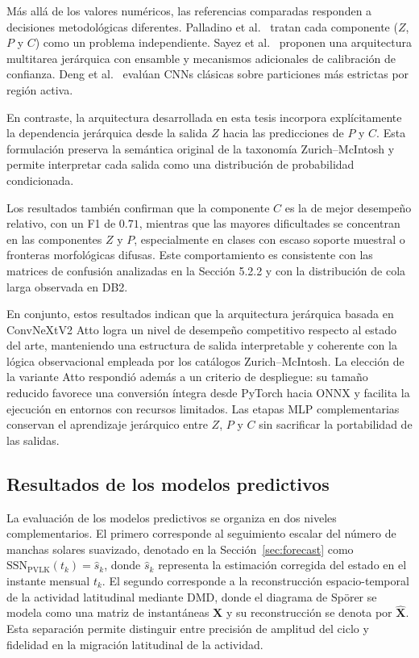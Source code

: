 Más allá de los valores numéricos, las referencias comparadas responden a
decisiones metodológicas diferentes. Palladino et al.~\citep{palladino2022sunspot}
tratan cada componente ($Z$, $P$ y $C$) como un problema independiente.
Sayez et al.~\citep{sayez2023sunscc} proponen una arquitectura multitarea
jerárquica con ensamble y mecanismos adicionales de calibración de confianza.
Deng et al.~\citep{deng2025mcintosh} evalúan CNNs clásicas sobre particiones
más estrictas por región activa.

En contraste, la arquitectura desarrollada en esta tesis incorpora explícitamente
la dependencia jerárquica desde la salida $Z$ hacia las predicciones de $P$ y
$C$. Esta formulación preserva la semántica original de la taxonomía
Zurich--McIntosh y permite interpretar cada salida como una distribución de
probabilidad condicionada.

Los resultados también confirman que la componente $C$ es la de mejor
desempeño relativo, con un F1 de $0.71$, mientras que las mayores dificultades
se concentran en las componentes $Z$ y $P$, especialmente en clases con escaso
soporte muestral o fronteras morfológicas difusas. Este comportamiento es
consistente con las matrices de confusión analizadas en la Sección 5.2.2 y con
la distribución de cola larga observada en DB2.

En conjunto, estos resultados indican que la arquitectura jerárquica basada en
ConvNeXtV2 Atto logra un nivel de desempeño competitivo respecto al estado del
arte, manteniendo una estructura de salida interpretable y coherente con la
lógica observacional empleada por los catálogos Zurich--McIntosh. La elección de
la variante Atto respondió además a un criterio de despliegue: su tamaño reducido
favorece una conversión íntegra desde PyTorch hacia ONNX y facilita la ejecución
en entornos con recursos limitados. Las etapas MLP complementarias conservan el
aprendizaje jerárquico entre $Z$, $P$ y $C$ sin sacrificar la portabilidad de
las salidas.


\subsection{Resultados de los modelos predictivos}

La evaluación de los modelos predictivos se organiza en dos niveles complementarios. El primero corresponde al seguimiento escalar del número de manchas solares suavizado, denotado en la Sección~\ref{sec:forecast} como $\mathrm{SSN}_{\mathrm{PVLK}}(t_k)=\widehat{s}_k$, donde $\widehat{s}_k$ representa la estimación corregida del estado en el instante mensual $t_k$. El segundo corresponde a la reconstrucción espacio-temporal de la actividad latitudinal mediante DMD, donde el diagrama de Spörer se modela como una matriz de instantáneas $\mathbf{X}$ y su reconstrucción se denota por $\widehat{\mathbf{X}}$. Esta separación permite distinguir entre precisión de amplitud del ciclo y fidelidad en la migración latitudinal de la actividad.

